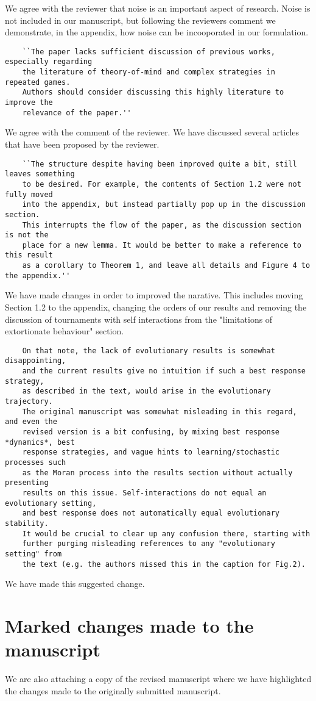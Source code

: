 \documentclass{article}
\begin{document}
We agree with the reviewer that noise is an important aspect of research. Noise
is not included in our manuscript, but following the reviewers comment we
demonstrate, in the appendix, how noise can be incooporated in our formulation.

\begin{verbatim}
    ``The paper lacks sufficient discussion of previous works, especially regarding
    the literature of theory-of-mind and complex strategies in repeated games.
    Authors should consider discussing this highly literature to improve the
    relevance of the paper.''
\end{verbatim}

We agree with the comment of the reviewer. We have discussed several articles
that have been proposed by the reviewer.

\begin{verbatim}
    ``The structure despite having been improved quite a bit, still leaves something
    to be desired. For example, the contents of Section 1.2 were not fully moved
    into the appendix, but instead partially pop up in the discussion section.
    This interrupts the flow of the paper, as the discussion section is not the
    place for a new lemma. It would be better to make a reference to this result
    as a corollary to Theorem 1, and leave all details and Figure 4 to the appendix.''
\end{verbatim}

We have made changes in order to improved the narative. This includes moving
Section 1.2 to the appendix, changing the orders of our results and removing
the discussion of tournaments with self interactions from the "limitations
of extortionate behaviour" section.

\begin{verbatim}
    On that note, the lack of evolutionary results is somewhat disappointing,
    and the current results give no intuition if such a best response strategy,
    as described in the text, would arise in the evolutionary trajectory.
    The original manuscript was somewhat misleading in this regard, and even the
    revised version is a bit confusing, by mixing best response *dynamics*, best
    response strategies, and vague hints to learning/stochastic processes such
    as the Moran process into the results section without actually presenting
    results on this issue. Self-interactions do not equal an evolutionary setting,
    and best response does not automatically equal evolutionary stability.
    It would be crucial to clear up any confusion there, starting with
    further purging misleading references to any "evolutionary setting" from
    the text (e.g. the authors missed this in the caption for Fig.2).
\end{verbatim}

We have made this suggested change.

\section{Marked changes made to the manuscript}

We are also attaching a copy of the revised manuscript where we have highlighted
the changes made to the originally submitted manuscript.


\end{document}
